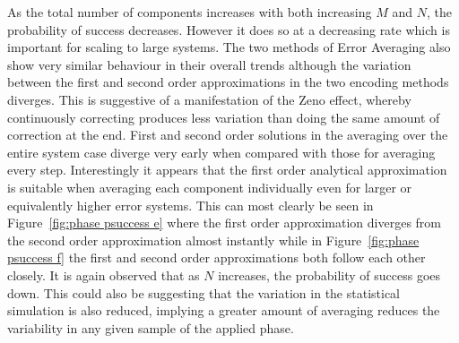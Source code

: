 \documentclass[aps,pra,twocolumn,superscriptaddress,numerical,floatfix]{revtex4-1}
\begin{document}
As the total number of components increases with both increasing $M$ and $N$, the probability of success decreases. However it does so at a decreasing rate which is important for scaling to large systems. The two methods of Error Averaging also show very similar behaviour in their overall trends although the variation between the first and second order approximations in the two encoding methods diverges. This is suggestive of a manifestation of the Zeno effect, whereby continuously correcting produces less variation than doing the same amount of correction at the end. First and second order solutions in the averaging over the entire system case diverge very early when compared with those for averaging every step. Interestingly it appears that the first order analytical approximation is suitable when averaging each component individually even for larger or equivalently higher error systems. This can most clearly be seen in Figure~\ref{fig:phase psuccess e} where the first order approximation diverges from the second order approximation almost instantly while in Figure~\ref{fig:phase psuccess f} the first and second order approximations both follow each other closely. It is again observed that as $N$ increases, the probability of success goes down. This could also be suggesting that the variation in the statistical simulation is also reduced, implying a greater amount of averaging reduces the variability in any given sample of the applied phase.
%
\end{document}
